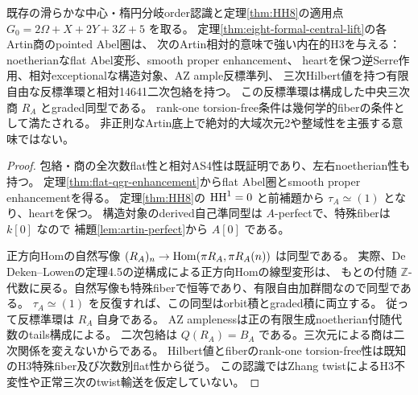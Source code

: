 \begin{theorem}[八変数族のArtin相対H3認識]\label{thm:formal-family-H3}
既存の滑らかな中心・楕円分岐order認識と定理\ref{thm:HH8}の適用点
$G_0=2\Omega+X+2Y+3Z+5$ を取る。
定理\ref{thm:eight-formal-central-lift}の各Artin商のpointed Abel圏は、
次のArtin相対的意味で強い内在的H3を与える：
noetherianなflat Abel変形、smooth proper enhancement、
heartを保つ逆Serre作用、相対exceptionalな構造対象、AZ ample反標準列、
三次Hilbert値を持つ有限自由な反標準環と相対14641二次包絡を持つ。
この反標準環は構成した中央三次商 $R_A$ とgraded同型である。
rank-one torsion-free条件は幾何学的fiberの条件として満たされる。
非正則なArtin底上で絶対的大域次元2や整域性を主張する意味ではない。
\end{theorem}
\begin{proof}
包絡・商の全次数flat性と相対AS4性は既証明であり、左右noetherian性も持つ。
定理\ref{thm:flat-qgr-enhancement}からflat Abel圏とsmooth proper enhancementを得る。
定理\ref{thm:HH8}の $\operatorname{HH}^1=0$ と前補題から $\tau_A\simeq(1)$ となり、heartを保つ。
構造対象のderived自己準同型は $A$-perfectで、特殊fiberは $k[0]$ なので
補題\ref{lem:artin-perfect}から $A[0]$ である。

正方向Homの自然写像
$(R_A)_n\to\operatorname{Hom}(\pi R_A,\pi R_A(n))$ は同型である。
実際、De Deken--Lowenの定理4.5の逆構成による正方向Homの線型変形は、
もとの付随 $\mathbb Z$-代数に戻る。自然写像も特殊fiberで恒等であり、有限自由加群間なので同型である。
$\tau_A\simeq(1)$ を反復すれば、この同型はorbit積とgraded積に両立する。
従って反標準環は $R_A$ 自身である。
AZ amplenessは正の有限生成noetherian付随代数のtails構成による。
二次包絡は $Q(R_A)=B_A$ である。三次元による商は二次関係を変えないからである。
Hilbert値とfiberのrank-one torsion-free性は既知のH3特殊fiber及び次数別flat性から従う。
この認識ではZhang twistによるH3不変性や正常三次のtwist輸送を仮定していない。
\end{proof}


